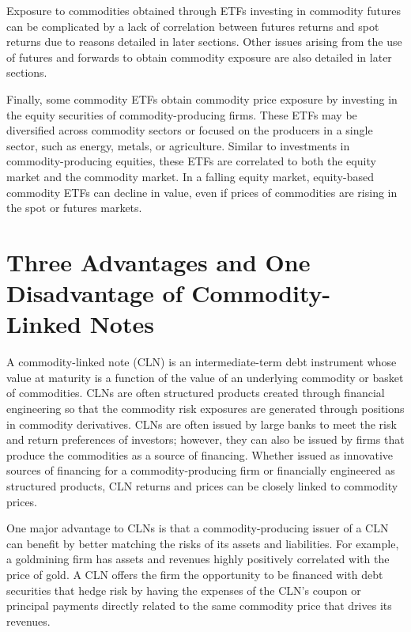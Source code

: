 \documentclass[11pt]{article}
\begin{document}
Exposure to commodities obtained through ETFs investing in commodity futures can be complicated by a lack of correlation between futures returns and spot returns due to reasons detailed in later sections. Other issues arising from the use of futures and forwards to obtain commodity exposure are also detailed in later sections.

Finally, some commodity ETFs obtain commodity price exposure by investing in the equity securities of commodity-producing firms. These ETFs may be diversified across commodity sectors or focused on the producers in a single sector, such as energy, metals, or agriculture. Similar to investments in commodity-producing equities, these ETFs are correlated to both the equity market and the commodity market. In a falling equity market, equity-based commodity ETFs can decline in value, even if prices of commodities are rising in the spot or futures markets.

\section*{Three Advantages and One Disadvantage of Commodity-Linked Notes}
A commodity-linked note (CLN) is an intermediate-term debt instrument whose value at maturity is a function of the value of an underlying commodity or basket of commodities. CLNs are often structured products created through financial engineering so that the commodity risk exposures are generated through positions in commodity derivatives. CLNs are often issued by large banks to meet the risk and return preferences of investors; however, they can also be issued by firms that produce the commodities as a source of financing. Whether issued as innovative sources of financing for a commodity-producing firm or financially engineered as structured products, CLN returns and prices can be closely linked to commodity prices.

One major advantage to CLNs is that a commodity-producing issuer of a CLN can benefit by better matching the risks of its assets and liabilities. For example, a goldmining firm has assets and revenues highly positively correlated with the price of gold. A CLN offers the firm the opportunity to be financed with debt securities that hedge risk by having the expenses of the CLN's coupon or principal payments directly related to the same commodity price that drives its revenues.
\end{document}
